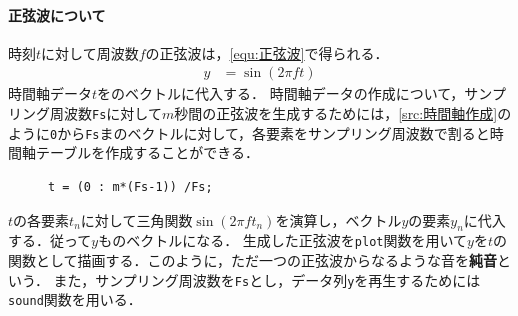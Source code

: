 \paragraph{正弦波について}時刻\(t\)に対して周波数\(f\)の正弦波は，\eqref{equ:正弦波}で得られる．
\begin{align}
    y & =\sin(2\pi ft)\label{equ:正弦波}
\end{align}
時間軸データ\(t\)をのベクトルに代入する．
時間軸データの作成について，サンプリング周波数\texttt{Fs}に対して\(m\)秒間の正弦波を生成するためには，\ref{src:時間軸作成}のように\texttt{0}から\texttt{Fs}まのベクトルに対して，各要素をサンプリング周波数で割ると時間軸テーブルを作成することができる．\par
\begin{figure}
    \begin{lstlisting}[caption={時間軸作成},numbers={none},label={src:時間軸作成}]
t = (0 : m*(Fs-1)) /Fs;
\end{lstlisting}
\end{figure}
\(t\)の各要素\(t_n\)に対して三角関数\(\sin(2\pi ft_n)\)を演算し，ベクトル\(y\)の要素\(y_n\)に代入する．従って\(y\)ものベクトルになる．
生成した正弦波を\texttt{plot}関数を用いて\(y\)を\(t\)の関数として描画する．このように，ただ一つの正弦波からなるような音を\textbf{純音}という．\cite[p.1]{音響工学理論基礎}
また，サンプリング周波数を\texttt{Fs}とし，データ列\texttt{y}を再生するためには\texttt{sound}関数を用いる．\par
